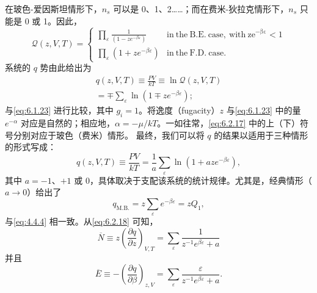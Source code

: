 在玻色-爱因斯坦情形下，\(n_{s}\) 可以是 0、1、2\ldots\ldots；而在费米-狄拉克情形下，\(n_{s}\) 只能是 0 或 1。因此，
\begin{equation}\tag{6.2.16}\label{eq:6.2.16}
\mathcal { Q } ( z , V , T ) = \left\{ \begin{array}{ll} { \displaystyle \prod _ { \varepsilon } \frac { 1 } { ( 1 - z e ^{- \beta \varepsilon} ) } } & { \mathrm { i n ~ t h e ~ B . E . ~ c a s e , ~ w i t h ~ z e ^{- \beta \varepsilon} < 1 } } \\{ \displaystyle \prod _ { \varepsilon } ( 1 + z e ^{- \beta \varepsilon} ) } & { \mathrm { i n ~ t h e ~ F . D . ~ c a s e . } } \end{array} \right.
\end{equation}
系统的 \(q\) 势由此给出为
\begin{equation}\tag{6.2.17}\label{eq:6.2.17}
\begin{array}{r} { q ( z , V , T ) \equiv \frac { P V } { k T } \equiv \ln \mathcal { Q } ( z , V , T ) } \\{ = \mp \sum _ { \varepsilon } \ln ( 1 \mp z e ^{- \beta \varepsilon} ) ; } \end{array}
\end{equation}
与\autoref{eq:6.1.23} 进行比较，其中 \(g_{i}=1\)。将逸度（fugacity）\(z\) 与\autoref{eq:6.1.23} 中的量 \(e^{-\alpha}\) 对应是自然的；相应地，\(\alpha=-\mu/kT\)。一如往常，\autoref{eq:6.2.17} 中的上（下）符号分别对应于玻色（费米）情形。
最终，我们可以将 \(q\) 的结果以适用于三种情形的形式写成：
\begin{equation}\tag{6.2.18}\label{eq:6.2.18}
q ( z , V , T ) \equiv \frac { P V } { k T } = \frac { 1 } { a } \sum _ { \varepsilon } \ln ( 1 + a z e ^{- \beta \varepsilon} ) ,
\end{equation}
其中 \(a = -1\)、\(+1\) 或 \(0\)，具体取决于支配该系统的统计规律。尤其是，经典情形（\(a \rightarrow 0\)）给出了
\begin{equation}\tag{6.2.19}\label{eq:6.2.19}
q _ { \mathrm { M . B . } } = z \sum _ { \varepsilon } e ^{- \beta \varepsilon} = z Q _ { 1 } ,
\end{equation}
与\autoref{eq:4.4.4} 相一致。从\autoref{eq:6.2.18} 可知，
\begin{equation}\tag{6.2.20}\label{eq:6.2.20}
\overline { { N } } \equiv z \left( \frac { \partial q } { \partial z } \right) _ { V , T } = \sum _ { \varepsilon } \frac { 1 } { z ^{- 1} e ^{\beta \varepsilon} + a }
\end{equation}
并且
\begin{equation}\tag{6.2.21}\label{eq:6.2.21}
\overline { { E } } \equiv - \left( \frac { \partial q } { \partial \beta } \right) _ { z , V } = \sum _ { \varepsilon } \frac { \varepsilon } { z ^{- 1} e ^{\beta \varepsilon} + a } .
\end{equation}
